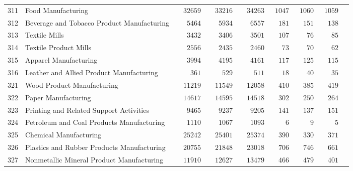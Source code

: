 \documentclass[9pt, oneside]{article}   	%
\begin{document}
\begin{longtable}{lp{3 in}ccccccc}
311  & Food Manufacturing & $\phantom{00}32659$ & $\phantom{00}33216$ & $\phantom{00}34263$ & $\phantom{0}1047$ & $\phantom{0}1060$ & $\phantom{0}1059$ \\
312  & Beverage and Tobacco Product Manufacturing & $\phantom{000}5464$ & $\phantom{000}5934$ & $\phantom{000}6557$ & $\phantom{00}181$ & $\phantom{00}151$ & $\phantom{00}138$ \\
313  & Textile Mills & $\phantom{000}3432$ & $\phantom{000}3406$ & $\phantom{000}3501$ & $\phantom{00}107$ & $\phantom{000}76$ & $\phantom{000}85$ \\
314  & Textile Product Mills & $\phantom{000}2556$ & $\phantom{000}2435$ & $\phantom{000}2460$ & $\phantom{000}73$ & $\phantom{000}70$ & $\phantom{000}62$ \\
315  & Apparel Manufacturing & $\phantom{000}3994$ & $\phantom{000}4195$ & $\phantom{000}4161$ & $\phantom{00}117$ & $\phantom{00}125$ & $\phantom{00}115$ \\
316  & Leather and Allied Product Manufacturing & $\phantom{0000}361$ & $\phantom{0000}529$ & $\phantom{0000}511$ & $\phantom{000}18$ & $\phantom{000}40$ & $\phantom{000}35$ \\
321  & Wood Product Manufacturing & $\phantom{00}11219$ & $\phantom{00}11549$ & $\phantom{00}12058$ & $\phantom{00}410$ & $\phantom{00}385$ & $\phantom{00}419$ \\
322  & Paper Manufacturing & $\phantom{00}14617$ & $\phantom{00}14595$ & $\phantom{00}14518$ & $\phantom{00}302$ & $\phantom{00}250$ & $\phantom{00}264$ \\
323  & Printing and Related Support Activities & $\phantom{000}9465$ & $\phantom{000}9237$ & $\phantom{000}9205$ & $\phantom{00}141$ & $\phantom{00}137$ & $\phantom{00}151$ \\
324  & Petroleum and Coal Products Manufacturing & $\phantom{000}1110$ & $\phantom{000}1067$ & $\phantom{000}1093$ & $\phantom{0000}6$ & $\phantom{0000}9$ & $\phantom{0000}5$ \\
325  & Chemical Manufacturing & $\phantom{00}25242$ & $\phantom{00}25401$ & $\phantom{00}25374$ & $\phantom{00}390$ & $\phantom{00}330$ & $\phantom{00}371$ \\
326  & Plastics and Rubber Products Manufacturing & $\phantom{00}20755$ & $\phantom{00}21848$ & $\phantom{00}23018$ & $\phantom{00}706$ & $\phantom{00}746$ & $\phantom{00}661$ \\
327  & Nonmetallic Mineral Product Manufacturing & $\phantom{00}11910$ & $\phantom{00}12627$ & $\phantom{00}13479$ & $\phantom{00}466$ & $\phantom{00}479$ & $\phantom{00}401$ \\

\end{longtable}
\end{document}
